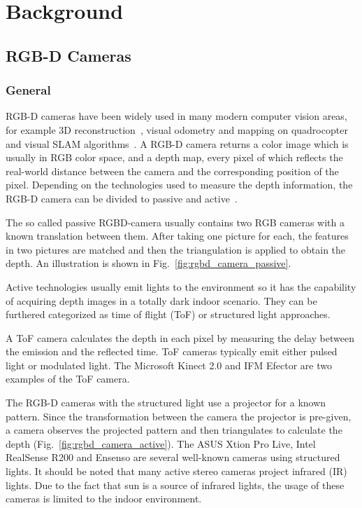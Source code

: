\chapter{Background} \label{chap:background}
\section{RGB-D Cameras}

\subsection{General}
RGB-D cameras have been widely used in many modern computer vision areas, for example 3D reconstruction~\cite{newcombe2011kinectfusion}, visual odometry and mapping on quadrocopter~\cite{huang2017visual} and visual SLAM algorithms~\cite{engelhard2011real}. 
A RGB-D camera returns a color image which is usually in RGB color space, and a depth map, every pixel of which reflects the real-world distance between the camera and the corresponding position of the pixel.
Depending on the technologies used to measure the depth information, the RGB-D camera can be divided to passive and active~\cite{kerl2012msc}.

The so called passive RGBD-camera usually contains two RGB cameras with a known translation between them.
After taking one picture for each, the features in two pictures are matched and then the triangulation is applied to obtain the depth.
An illustration is shown in Fig.~\ref{fig:rgbd_camera_passive}.

Active technologies usually emit lights to the environment so it has the capability of acquiring depth images in a totally dark indoor scenario.
They can be furthered categorized as time of flight (ToF) or structured light approaches.

A ToF camera calculates the depth in each pixel by measuring the delay between the emission and the reflected time.
ToF cameras typically emit either pulsed light or modulated light.
The Microsoft Kinect 2.0 and IFM Efector are two examples of the ToF camera.

The RGB-D cameras with the structured light use a projector for a known pattern. 
Since the transformation between the camera the projector is pre-given, a camera observes the projected pattern and then triangulates to calculate the depth (Fig.~\ref{fig:rgbd_camera_active}).
The ASUS Xtion Pro Live, Intel RealSense R200 and Ensenso are several well-known cameras using structured lights.
It should be noted that many active stereo cameras project infrared (IR) lights. 
Due to the fact that sun is a source of infrared lights, the usage of these cameras is limited to the indoor environment.


